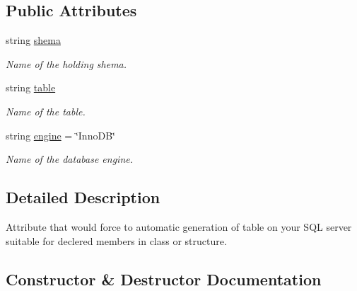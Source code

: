 \subsection*{Public Attributes}
\begin{DoxyCompactItemize}
\item 
string \mbox{\hyperlink{class_uniform_data_operator_1_1_sql_1_1_tables_1_1_attributes_1_1_table_a7b9dd4e1623154ae8956d699bced397d}{shema}}
\begin{DoxyCompactList}\small\item\em Name of the holding shema. \end{DoxyCompactList}\item 
string \mbox{\hyperlink{class_uniform_data_operator_1_1_sql_1_1_tables_1_1_attributes_1_1_table_a107099bc2c29a01d3d4885751fe49c98}{table}}
\begin{DoxyCompactList}\small\item\em Name of the table. \end{DoxyCompactList}\item 
string \mbox{\hyperlink{class_uniform_data_operator_1_1_sql_1_1_tables_1_1_attributes_1_1_table_a1d9e900b69ea04e44858116c6aa01983}{engine}} = \char`\"{}Inno\+DB\char`\"{}
\begin{DoxyCompactList}\small\item\em Name of the database engine. \end{DoxyCompactList}\end{DoxyCompactItemize}


\subsection{Detailed Description}
Attribute that would force to automatic generation of table on your S\+QL server suitable for declered members in class or structure. 



\subsection{Constructor \& Destructor Documentation}
\mbox{\label{class_uniform_data_operator_1_1_sql_1_1_tables_1_1_attributes_1_1_table_a9a9520de93e5915cc5ba19876a46fd72}} 
